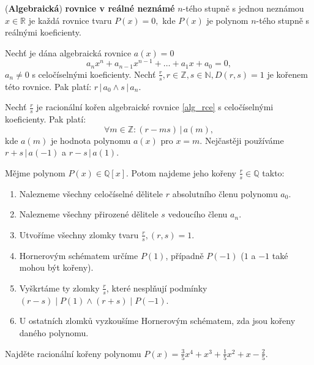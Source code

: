 \begin{definition}
(\textbf{Algebraická}) \textbf{rovnice v reálné neznámé} $n$-tého stupně s jednou neznámou $x\in \mathbb R$ je každá
rovnice tvaru $P(x)=0,$ kde $P(x)$ je polynom $n$-tého stupně s reálnými koeficienty.
\end{definition}

\begin{veta}
    Nechť je dána algebraická rovnice $a(x)=0$
    \begin{equation}\label{alg_rce}
        a_nx^n + a_{n-1}x^{n-1}+\dots + a_1x+a_0=0,
    \end{equation}
    $a_n \ne 0$ s celočíselnými koeficienty. Nechť $\frac{r}{s}, r\in \mathbb Z, s \in \mathbb N, D(r,s)=1$ je kořenem této rovnice.
    Pak platí: $r \, | \, a_0 \land s \, |\, a_n.$
\end{veta}

\begin{veta}\label{odecitanivpolynomu}
    Nechť $\frac{r}{s}$ je racionální kořen algebraické rovnice \ref{alg_rce} s celočíselnými koeficienty.
    Pak platí:
    $$\forall m \in \mathbb Z: (r-ms) \, |\, a(m),$$
    kde $a(m)$ je hodnota polynomu $a(x)$ pro $x=m.$ Nejčastěji používáme $r + s \, | \, a(-1)$ a $r - s \, |\, a(1).$
\end{veta}

\begin{veta}
  Mějme polynom $P(x) \in \mathbb Q [x]$. Potom najdeme jeho kořeny $\frac{r}{s} \in \mathbb Q$ takto:
  \begin{enumerate}[1.]
    \item Nalezneme všechny celočíselné dělitele $r$ absolutního členu polynomu $a_0$.
    \item Nalezneme všechny přirozené dělitele $s$ vedoucího členu $a_n$.
    \item Utvoříme všechny zlomky tvaru $\frac{r}{s}, (r,s) = 1$.
    \item Hornerovým schématem určíme $P(1)$, případně $P(-1)$ ($1$ a $-1$ také mohou být kořeny).
    \item Vyškrtáme ty zlomky $\frac{r}{s}$, které nesplňují podmínky $(r-s) \mid P(1) \land (r+s) \mid P(-1)$.
    \item U ostatních zlomků vyzkoušíme Hornerovým schématem, zda jsou kořeny daného polynomu.
  \end{enumerate}
\end{veta}

\begin{priklad}
Najděte racionální kořeny polynomu $P(x)=\frac{3}{5}x^4+x^3+\frac{1}{5}x^2+x-\frac{2}{5}.$
\end{priklad}

